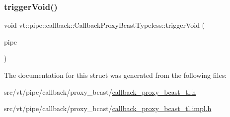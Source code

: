 \subsubsection{\texorpdfstring{trigger\+Void()}{triggerVoid()}}
{\footnotesize\ttfamily void vt\+::pipe\+::callback\+::\+Callback\+Proxy\+Bcast\+Typeless\+::trigger\+Void (\begin{DoxyParamCaption}\item[{\hyperlink{namespacevt_ac9852acda74d1896f48f406cd72c7bd3}{Pipe\+Type} const \&}]{pipe }\end{DoxyParamCaption})\hspace{0.3cm}{\ttfamily [inline]}}



The documentation for this struct was generated from the following files\+:\begin{DoxyCompactItemize}
\item 
src/vt/pipe/callback/proxy\+\_\+bcast/\hyperlink{callback__proxy__bcast__tl_8h}{callback\+\_\+proxy\+\_\+bcast\+\_\+tl.\+h}\item 
src/vt/pipe/callback/proxy\+\_\+bcast/\hyperlink{callback__proxy__bcast__tl_8impl_8h}{callback\+\_\+proxy\+\_\+bcast\+\_\+tl.\+impl.\+h}\end{DoxyCompactItemize}
